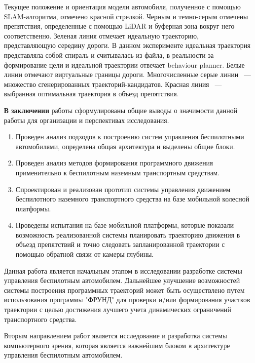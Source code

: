 Текущее положение и ориентация модели автомобиля, полученное с помощью SLAM-алгоритма, отмечено
красной стрелкой. Черным и темно-серым отмечены препятствия, определенные с помощью LiDAR и буферная
зона вокруг него соответственно. Зеленая линия отмечает идеальную траекторию, представляющую
середину дороги. В данном эксперименте идеальная траектория представляла собой спираль и считывалась
из файла, в реальности за формирование цели и идеальной траектории отвечает behaviour planner.
Белые линии отмечают виртуальные границы дороги. Многочисленные серые линии ~--- множество
сгенерированных траекторий-кандидатов. Красная линия ~--- выбранная оптимальная траектория
в объезд препятствия.



\textbf{В заключении} работы сформулированы общие выводы о значимости данной работы для
организации и перспективах исследования.

\begin{enumerate}
    \item Проведен анализ подходов к построению систем управления беспилотными
          автомобилями, определена общая архитектура и выделены общие блоки.
    \item Проведен анализ методов формирования программного движения применительно к беспилотным наземным транспортным
          средствам.
    \item Спроектирован и реализован прототип системы управления движением беспилотного
          наземного транспортного средства на базе мобильной колесной платформы.
    \item Проведены испытания на базе мобильной платформы, которые показали возможность
          реализованной системы планировать траекторию движения в объезд препятствий и
          точно следовать запланированной траектории с помощью обратной связи от камеры глубины.

\end{enumerate}

Данная работа является начальным этапом в исследовании разработке системы управления
беспилотным автомобилем.
Дальнейшее улучшение возможностей системы построения программных траекторий может быть осуществлено путем использования
программы "ФРУНД" для проверки и/или формирования участков траектории с целью достижения лучшего учета динамических
ограничений транспортного средства.

Вторым направлением работ является исследование и разработка системы компьютерного зрения,
которая является важнейшим блоком в архитектуре управления беспилотным автомобилем.

